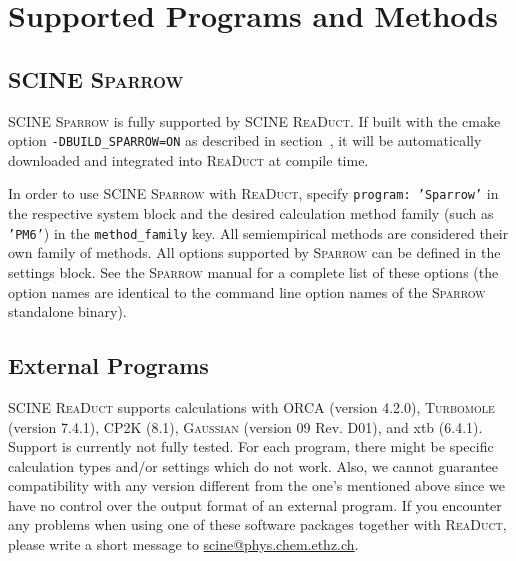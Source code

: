 \documentclass[]{tufte-book}
\begin{document}
\section{Supported Programs and Methods}

\subsection{SCINE \textsc{Sparrow}}

SCINE \textsc{Sparrow} is fully supported by SCINE \textsc{ReaDuct}. If built with the cmake option \texttt{-DBUILD\_SPARROW=ON}
as described in section~, it will be automatically downloaded and integrated into \textsc{ReaDuct}
at compile time.

In order to use SCINE \textsc{Sparrow} with \textsc{ReaDuct}, specify \texttt{program: 'Sparrow'} in the respective system
block and the desired calculation method family (such as \texttt{'PM6'}) in the \texttt{method\_family} key.
All semiempirical methods are considered their own family of methods.
All options supported by \textsc{Sparrow} can be defined in the settings block. See the \textsc{Sparrow} manual for a complete
list of these options (the option names are identical to the command line option names of the \textsc{Sparrow} standalone binary).

\subsection{External Programs}

SCINE \textsc{ReaDuct} supports calculations with \textsc{ORCA}\cite{orca} (version 4.2.0), \textsc{Turbomole}\cite{turbomole} (version 7.4.1), \textsc{CP2K} (8.1)\cite{cp2k}, \textsc{Gaussian}\cite{gaussian09} (version 09 Rev. D01), and xtb (6.4.1)\cite{xtb}. Support is currently not fully tested. For each program, there might be specific calculation types and/or settings which do not work. Also, we cannot guarantee compatibility with any version different from the one's mentioned above since we have no control over the output format of an external program. If you encounter any problems when
using one of these software packages together with \textsc{ReaDuct}, please write a short message to \href{scine@phys.chem.ethz.ch}{scine@phys.chem.ethz.ch}.
\end{document}
